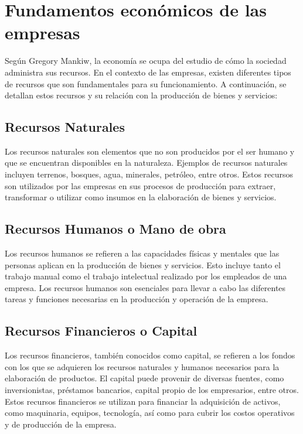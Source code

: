 \documentclass[
  letterpaper,
  DIV=11,
  numbers=noendperiod]{scrartcl}
\begin{document}
\hypertarget{fundamentos-econuxf3micos-de-las-empresas}{%
\section{Fundamentos económicos de las
empresas}\label{fundamentos-econuxf3micos-de-las-empresas}}

Según Gregory Mankiw, la economía se ocupa del estudio de cómo la
sociedad administra sus recursos. En el contexto de las empresas,
existen diferentes tipos de recursos que son fundamentales para su
funcionamiento. A continuación, se detallan estos recursos y su relación
con la producción de bienes y servicios:

\hypertarget{recursos-naturales}{%
\subsection{Recursos Naturales}\label{recursos-naturales}}

Los recursos naturales son elementos que no son producidos por el ser
humano y que se encuentran disponibles en la naturaleza. Ejemplos de
recursos naturales incluyen terrenos, bosques, agua, minerales,
petróleo, entre otros. Estos recursos son utilizados por las empresas en
sus procesos de producción para extraer, transformar o utilizar como
insumos en la elaboración de bienes y servicios.

\hypertarget{recursos-humanos-o-mano-de-obra}{%
\subsection{Recursos Humanos o Mano de
obra}\label{recursos-humanos-o-mano-de-obra}}

Los recursos humanos se refieren a las capacidades físicas y mentales
que las personas aplican en la producción de bienes y servicios. Esto
incluye tanto el trabajo manual como el trabajo intelectual realizado
por los empleados de una empresa. Los recursos humanos son esenciales
para llevar a cabo las diferentes tareas y funciones necesarias en la
producción y operación de la empresa.

\hypertarget{recursos-financieros-o-capital}{%
\subsection{Recursos Financieros o
Capital}\label{recursos-financieros-o-capital}}

Los recursos financieros, también conocidos como capital, se refieren a
los fondos con los que se adquieren los recursos naturales y humanos
necesarios para la elaboración de productos. El capital puede provenir
de diversas fuentes, como inversionistas, préstamos bancarios, capital
propio de los empresarios, entre otros. Estos recursos financieros se
utilizan para financiar la adquisición de activos, como maquinaria,
equipos, tecnología, así como para cubrir los costos operativos y de
producción de la empresa.
\end{document}
